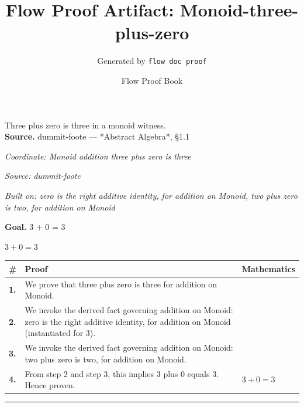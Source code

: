 \documentclass[11pt]{article}
\title{Flow Proof Artifact: Monoid-three-plus-zero}
\author{Generated by \texttt{flow doc proof}}
\date{Flow Proof Book}
\theoremstyle{definition}
\begin{document}
\maketitle
Three plus zero is three in a monoid witness.\\[0.5em]
\textbf{Source.} dummit-foote — *Abstract Algebra*, §1.1\\[0.5em]
\bigskip
{}\par
\smallskip\noindent\textit{Coordinate: Monoid \cdot addition \cdot three plus zero is three}\par
\smallskip\noindent\textit{Source: dummit-foote}\par
\smallskip\noindent\textit{Built on: zero is the right additive identity, for addition on Monoid, two plus zero is two, for addition on Monoid}\par
\medskip
\noindent\textbf{Goal.} 3 + 0 = 3\par
\noindent$\displaystyle 3 + 0 = 3$\par
\medskip
\noindent
\begin{tabular}{@{} >{\raggedright\arraybackslash}p{} >{\raggedright\arraybackslash}p{} >{\raggedleft\arraybackslash}p{} @{}}
\textbf{\#} & \textbf{Proof} & \textbf{Mathematics} \\
\midrule
\textbf{1.} & We prove that three plus zero is three for addition on Monoid. & \\[0.45em]
\textbf{2.} & We invoke the derived fact governing addition on Monoid: zero is the right additive identity, for addition on Monoid (instantiated for 3). & \\[0.45em]
\textbf{3.} & We invoke the derived fact governing addition on Monoid: two plus zero is two, for addition on Monoid. & \\[0.45em]
\textbf{4.} & From step 2 and step 3, this implies 3 plus 0 equals 3. Hence proven. & $\displaystyle 3 + 0 = 3$ \\[0.45em]
\bottomrule
\end{tabular}
\label{thm:Monoid-addition-three_plus_zero_is_three}
\par\medskip\hrule
\end{document}
